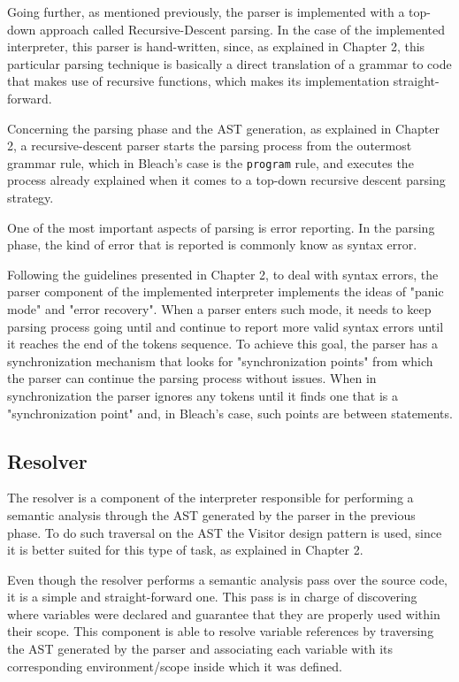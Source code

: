 Going further, as mentioned previously, the parser is implemented with a top-down approach called Recursive-Descent parsing. In the case of the implemented interpreter, this parser is hand-written, since, as explained in Chapter 2, this particular parsing technique is basically a direct translation of a grammar to code that makes use of recursive functions, which makes its implementation straight-forward.

Concerning the parsing phase and the AST generation, as explained in Chapter 2, a recursive-descent parser starts the parsing process from the outermost grammar rule, which in Bleach's case is the \texttt{program} rule, and executes the process already explained when it comes to a top-down recursive descent parsing strategy.

One of the most important aspects of parsing is error reporting. In the parsing phase, the kind of error that is reported is commonly know as syntax error.

Following the guidelines presented in Chapter 2, to deal with syntax errors, the parser component of the implemented interpreter implements the ideas of "panic mode" and "error recovery". When a parser enters such mode, it needs to keep parsing process going until and continue to report more valid syntax errors until it reaches the end of the tokens sequence. To achieve this goal, the parser has a synchronization mechanism that looks for "synchronization points" from which the parser can continue the parsing process without issues. When in synchronization the parser ignores any tokens until it finds one that is a "synchronization point" and, in Bleach's case, such points are between statements.

\subsection{Resolver}
The resolver is a component of the interpreter responsible for performing a semantic analysis through the AST generated by the parser in the previous phase. To do such traversal on the AST the Visitor design pattern is used, since it is better suited for this type of task, as explained in Chapter 2. 

Even though the resolver performs a semantic analysis pass over the source code, it is a simple and straight-forward one. This pass is in charge of discovering where variables were declared and guarantee that they are properly used within their scope. This component is able to resolve variable references by traversing the AST generated by the parser and associating each variable with its corresponding environment/scope inside which it was defined.


